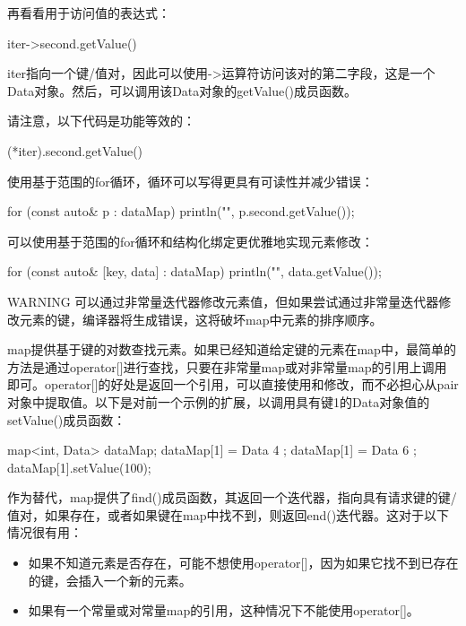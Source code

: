再看看用于访问值的表达式：

\begin{cpp}
iter->second.getValue()
\end{cpp}

iter指向一个键/值对，因此可以使用->运算符访问该对的第二字段，这是一个Data对象。然后，可以调用该Data对象的getValue()成员函数。

请注意，以下代码是功能等效的：

\begin{cpp}
(*iter).second.getValue()
\end{cpp}

使用基于范围的for循环，循环可以写得更具有可读性并减少错误：

\begin{cpp}
for (const auto& p : dataMap) {
    println("{}", p.second.getValue());
}
\end{cpp}

可以使用基于范围的for循环和结构化绑定更优雅地实现元素修改：

\begin{cpp}
for (const auto& [key, data] : dataMap) {
    println("{}", data.getValue());
}
\end{cpp}

\begin{myWarning}{WARNING}
可以通过非常量迭代器修改元素值，但如果尝试通过非常量迭代器修改元素的键，编译器将生成错误，这将破坏map中元素的排序顺序。
\end{myWarning}


map提供基于键的对数查找元素。如果已经知道给定键的元素在map中，最简单的方法是通过operator[]进行查找，只要在非常量map或对非常量map的引用上调用即可。operator[]的好处是返回一个引用，可以直接使用和修改，而不必担心从pair对象中提取值。以下是对前一个示例的扩展，以调用具有键1的Data对象值的setValue()成员函数：

\begin{cpp}
map<int, Data> dataMap;
dataMap[1] = Data { 4 };
dataMap[1] = Data { 6 };
dataMap[1].setValue(100);
\end{cpp}

作为替代，map提供了find()成员函数，其返回一个迭代器，指向具有请求键的键/值对，如果存在，或者如果键在map中找不到，则返回end()迭代器。这对于以下情况很有用：

\begin{itemize}
\item
如果不知道元素是否存在，可能不想使用operator[]，因为如果它找不到已存在的键，会插入一个新的元素。

\item
如果有一个常量或对常量map的引用，这种情况下不能使用operator[]。
\end{itemize}

